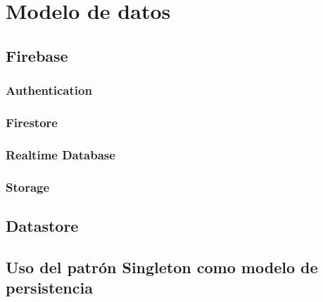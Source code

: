 \chapter{Modelo de datos}
\label{cap:modeloDeDatos}
\section{Firebase} \hypertarget{subsec:firebase}{}
\subsection{Authentication}
\subsection{Firestore}
\subsection{Realtime Database}
\subsection{Storage}
\section{Datastore}
\section{Uso del patrón Singleton como modelo de persistencia}
